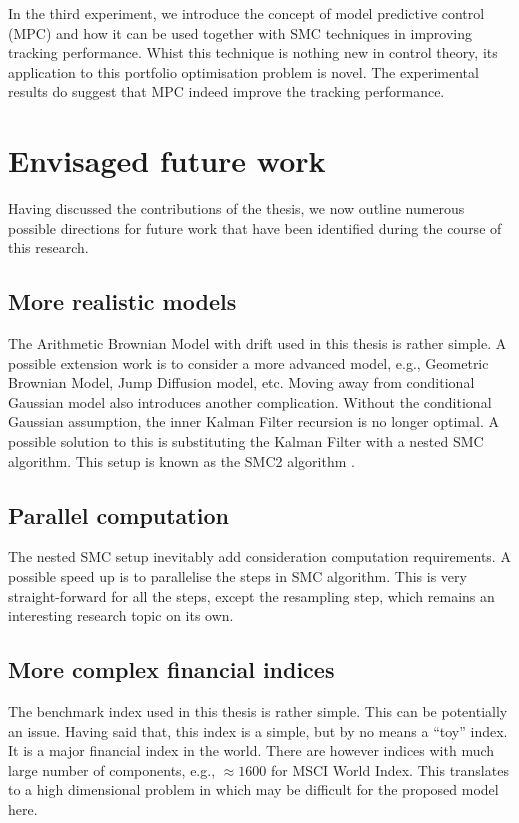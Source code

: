 In the third experiment, we introduce the concept of model predictive control (MPC) and how it can be used together with SMC techniques in improving tracking performance. Whist this technique is nothing new in control theory, its application to this portfolio optimisation problem is novel. The experimental results do suggest that MPC indeed improve the tracking performance.

\section{Envisaged future work}
Having discussed the contributions of the thesis, we now outline
numerous possible directions for future work that have been identified
during the course of this research.

\subsection{More realistic models}
The Arithmetic Brownian Model with drift used in this thesis is rather simple. A possible extension work is to consider a more advanced model, e.g., Geometric Brownian Model, Jump Diffusion model, etc. Moving away from conditional Gaussian model also introduces another complication. Without the conditional Gaussian assumption, the inner Kalman Filter recursion is no longer optimal. A possible solution to this is substituting the Kalman Filter with a nested SMC algorithm. This setup is known as the SMC2 algorithm \cite{CN13}.

\subsection{Parallel computation}
The nested SMC setup inevitably add consideration computation requirements. A possible speed up is to parallelise the steps in SMC algorithm. This is very straight-forward for all the steps, except the resampling step, which remains an interesting research topic on its own. 

\subsection{More complex financial indices}
The benchmark index used in this thesis is rather simple. This can
be potentially an issue. Having said that, this index is a simple, but by no means a ``toy''
index. It is a major financial index in the world. There are however indices with much large number of components, e.g., $\approx 1600$ for MSCI World Index. This translates to a high dimensional problem in which may be difficult for the proposed model here.

